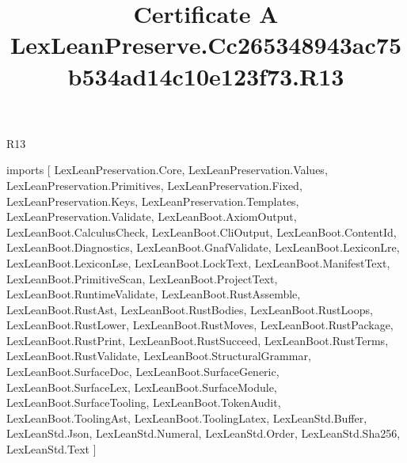 \begin{lexlean}{R13}
\title{Certificate A LexLeanPreserve.Cc265348943ac75b534ad14c10e123f73.R13}
\begin{coremodule}
imports [
  LexLeanPreservation.Core,
  LexLeanPreservation.Values,
  LexLeanPreservation.Primitives,
  LexLeanPreservation.Fixed,
  LexLeanPreservation.Keys,
  LexLeanPreservation.Templates,
  LexLeanPreservation.Validate,
  LexLeanBoot.AxiomOutput,
  LexLeanBoot.CalculusCheck,
  LexLeanBoot.CliOutput,
  LexLeanBoot.ContentId,
  LexLeanBoot.Diagnostics,
  LexLeanBoot.GnafValidate,
  LexLeanBoot.LexiconLre,
  LexLeanBoot.LexiconLse,
  LexLeanBoot.LockText,
  LexLeanBoot.ManifestText,
  LexLeanBoot.PrimitiveScan,
  LexLeanBoot.ProjectText,
  LexLeanBoot.RuntimeValidate,
  LexLeanBoot.RustAssemble,
  LexLeanBoot.RustAst,
  LexLeanBoot.RustBodies,
  LexLeanBoot.RustLoops,
  LexLeanBoot.RustLower,
  LexLeanBoot.RustMoves,
  LexLeanBoot.RustPackage,
  LexLeanBoot.RustPrint,
  LexLeanBoot.RustSucceed,
  LexLeanBoot.RustTerms,
  LexLeanBoot.RustValidate,
  LexLeanBoot.StructuralGrammar,
  LexLeanBoot.SurfaceDoc,
  LexLeanBoot.SurfaceGeneric,
  LexLeanBoot.SurfaceLex,
  LexLeanBoot.SurfaceModule,
  LexLeanBoot.SurfaceTooling,
  LexLeanBoot.TokenAudit,
  LexLeanBoot.ToolingAst,
  LexLeanBoot.ToolingLatex,
  LexLeanStd.Buffer,
  LexLeanStd.Json,
  LexLeanStd.Numeral,
  LexLeanStd.Order,
  LexLeanStd.Sha256,
  LexLeanStd.Text
]


\end{coremodule}
\end{lexlean}
